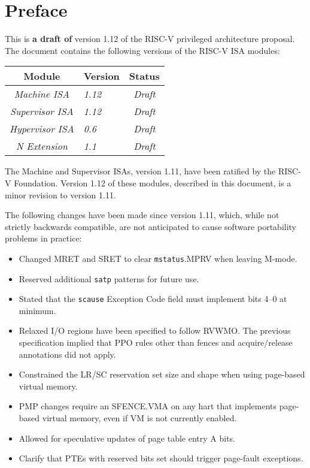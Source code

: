 \chapter{Preface}

This is {\bf a draft of} version 1.12 of the RISC-V privileged
architecture proposal.
The document contains the following versions of the RISC-V ISA
modules:

{
\begin{table}[hbt]
  \centering
  \begin{tabular}{|c|l|c|}
    \hline
    Module             & Version  & Status\\
    \hline
    \em Machine ISA    & \em 1.12 & \em Draft \\
    \em Supervisor ISA & \em 1.12 & \em Draft \\
    \em Hypervisor ISA & \em 0.6  & \em Draft \\
    \em N Extension    & \em 1.1 & \em Draft \\
    \hline
  \end{tabular}
\end{table}
}

The Machine and Supervisor ISAs, version 1.11, have been ratified by
the RISC-V Foundation.  Version 1.12 of these modules, described in
this document, is a minor revision to version 1.11.

The following changes have been made since version 1.11, which, while not
strictly backwards compatible, are not anticipated to cause software
portability problems in practice:
\vspace{-0.2in}
\begin{itemize}
  \parskip 0pt
  \itemsep 1pt
\item Changed MRET and SRET to clear {\tt mstatus}.MPRV when leaving M-mode.
\item Reserved additional {\tt satp} patterns for future use.
\item Stated that the {\tt scause} Exception Code field must implement
  bits 4--0 at minimum.
\item Relaxed I/O regions have been specified to follow RVWMO.  The previous
  specification implied that PPO rules other than fences and acquire/release
  annotations did not apply.
\item Constrained the LR/SC reservation set size and shape when using
  page-based virtual memory.
\item PMP changes require an SFENCE.VMA on any hart that implements
  page-based virtual memory, even if VM is not currently enabled.
\item Allowed for speculative updates of page table entry A bits.
\item Clarify that PTEs with reserved bits set should trigger page-fault
  exceptions.
\end{itemize}

